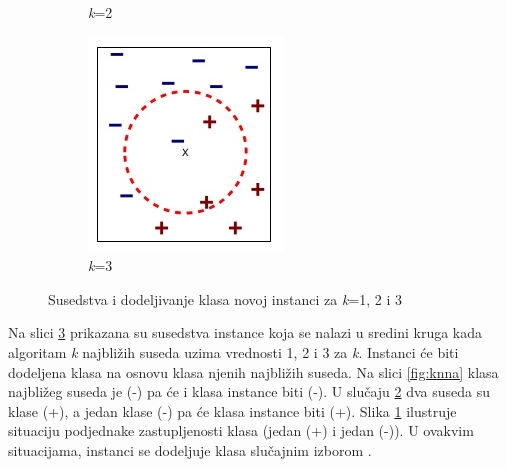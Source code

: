 \documentclass[12pt,oneside]{memoir}
\begin{document}
\begin{figure}[!ht]
\begin{subfigure}[b]{0.3\textwidth}
        \caption{\textit{k}=2}
        \label{fig:knnb}
    \end{subfigure}
    \hfill
    \begin{subfigure}[b]{0.3\textwidth}
        \centering
        \includegraphics[width=\textwidth]{knnc}
        \caption{\textit{k}=3}
        \label{fig:knnc}
    \end{subfigure}
    \caption{Susedstva i dodeljivanje klasa novoj instanci za \textit{k}=1, 2 i 3}
    \label{fig:knn}
\end{figure}

Na slici \ref{fig:knn} prikazana su susedstva instance koja se nalazi u sredini kruga kada algoritam \textit{k} najbližih suseda uzima vrednosti 1, 2 i 3 za \textit{k}. Instanci će biti dodeljena klasa na osnovu klasa njenih najbližih suseda. Na slici \ref{fig:knna} klasa najbližeg suseda je (-) pa će i klasa instance biti (-). U slučaju \ref{fig:knnc} dva suseda su klase (+), a jedan klase (-) pa će klasa instance biti (+). Slika \ref{fig:knnb} ilustruje situaciju podjednake zastupljenosti klasa (jedan (+) i jedan (-)). U ovakvim situacijama, instanci se dodeljuje klasa slučajnim izborom \cite{mitic}.
\end{document}
